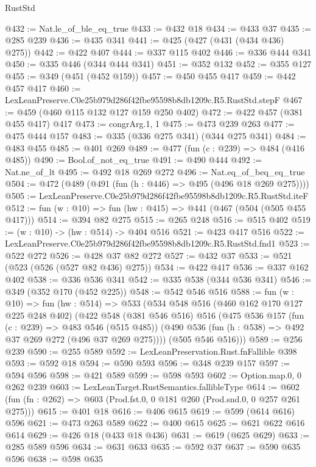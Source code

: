 \begin{lexlean}{RustStd}
\begin{coremodule}
@432 := Nat.le_of_ble_eq_true
@433 := @432 @18
@434 := @433 @37
@435 := @285 @239
@436 := @435 @341
@441 := @425 (@427 (@431 (@434 @436) @275))
@442 := @422 @407
@444 := @337 @115 @402
@446 := @336 @444 @341
@450 := @335 @446 (@344 @444 @341)
@451 := @352 @132
@452 := @355 @127
@455 := @349 (@451 (@452 @159))
@457 := @450 @455 @417
@459 := @442 @457 @417
@460 := LexLeanPreserve.C0e25b979d286f42fbe95598b8db1209c.R5.RustStd.stepF
@467 := @459 (@460 @115 @132 @127 @159 @250 @402)
@472 := @422 @457 (@381 @455 @417) @417
@473 := congrArg.{1, 1}
@475 := @473 @239 @263
@477 := @475 @444 @157
@483 := @335 (@336 @275 @341) (@344 @275 @341)
@484 := @483 @455
@485 := @401 @269
@489 := @477 (fun (c : @239) => @484 (@416 @485))
@490 := Bool.of_not_eq_true
@491 := @490 @444
@492 := Nat.ne_of_lt
@495 := @492 @18 @269 @272
@496 := Nat.eq_of_beq_eq_true
@504 := @472 (@489 (@491 (fun (h : @446) => @495 (@496 @18 @269 @275))))
@505 := LexLeanPreserve.C0e25b979d286f42fbe95598b8db1209c.R5.RustStd.iteF
@512 := fun (w : @10) => fun (hw : @415) => @441 (@467 (@504 (@505 @455 @417)))
@514 := @394 @82 @275
@515 := @265 @248
@516 := @515 @402
@519 := (w : @10) -> (hw : @514) -> @404 @516
@521 := @423 @417 @516
@522 := LexLeanPreserve.C0e25b979d286f42fbe95598b8db1209c.R5.RustStd.fnd1
@523 := @522 @272
@526 := @428 @37 @82 @272
@527 := @432 @37
@533 := @521 (@523 (@526 (@527 @82 @436) @275))
@534 := @422 @417
@536 := @337 @162 @402
@538 := @336 @536 @341
@542 := @335 @538 (@344 @536 @341)
@546 := @349 (@352 @170 (@452 @225))
@548 := @542 @546 @516
@588 := fun (w : @10) =>
  fun (hw : @514) =>
  @533
    (@534
      @548
      @516
      (@460 @162 @170 @127 @225 @248 @402)
      (@422
        @548
        (@381 @546 @516)
        @516
        (@475
          @536
          @157
          (fun (c : @239) => @483 @546 (@515 @485))
          (@490 @536 (fun (h : @538) => @492 @37 @269 @272 (@496 @37 @269 @275))))
        (@505 @546 @516)))
@589 := @256 @239
@590 := @255 @589
@592 := LexLeanPreservation.Rust.fnFallible @398
@593 := @592 @18
@594 := @590 @593
@596 := @348 @239 @157
@597 := @594 @596
@598 := @421 @589
@599 := @598 @593
@602 := Option.map.{0, 0} @262 @239
@603 := LexLeanTarget.RustSemantics.fallibleType
@614 := @602 (fun (fn : @262) => @603 (Prod.fst.{0, 0} @181 @260 (Prod.snd.{0, 0} @257 @261 @275)))
@615 := @401 @18
@616 := @406 @615
@619 := @599 (@614 @616) @596
@621 := @473 @263 @589
@622 := @400 @615
@625 := @621 @622 @616 @614
@629 := @426 @18 (@433 @18 @436)
@631 := @619 (@625 @629)
@633 := @285 @589 @596
@634 := @631 @633
@635 := @592 @37
@637 := @590 @635 @596
@638 := @598 @635

\end{coremodule}
\end{lexlean}
